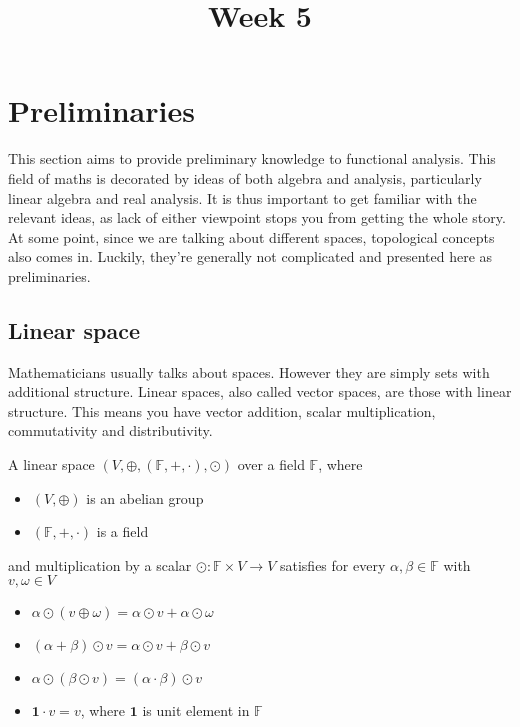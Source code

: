 \documentclass{article}
\title{Week 5}
\begin{document}
\maketitle

\section{Preliminaries}\label{vector space defs}
This section aims to provide preliminary knowledge to functional analysis. This field of maths is decorated by ideas of both algebra and analysis, particularly linear algebra and real analysis. It is thus important to get familiar with the relevant ideas, as lack of either viewpoint stops you from getting the whole story. At some point, since we are talking about different spaces, topological concepts also comes in. Luckily, they're generally not complicated and presented here as preliminaries.  


\subsection{Linear space}
Mathematicians usually talks about spaces. However they are simply sets with additional structure. Linear spaces, also called vector spaces, are those with linear structure. This means you have vector addition, scalar multiplication, commutativity and distributivity.
\begin{definition}\rm\nextline
	A linear space $(V,\oplus,(\mathbb{F},+,\cdot),\odot)$ over a field $\mathbb{F}$, where
	\begin{itemize}
		\item $(V,\oplus)$ is an abelian group
		\item $(\mathbb{F},+,\cdot)$ is a field
	\end{itemize}
	and multiplication by a scalar $\odot:\mathbb{F}\times V\xrightarrow{}V$ satisfies for every $\alpha,\beta\in\mathbb{F}$ with $v,\omega\in V$
	\begin{itemize}
		\item $\alpha\odot(v\oplus\omega)=\alpha\odot v+\alpha\odot\omega$
		\item $(\alpha+\beta)\odot v=\alpha\odot v+\beta\odot v$
		\item $\alpha\odot(\beta\odot v)=(\alpha\cdot\beta)\odot v$
		\item $\mathbf{1}\cdot v=v$, where $\mathbf{1}$ is unit element in $\mathbb{F}$
	\end{itemize}
\end{definition}
\end{document}
